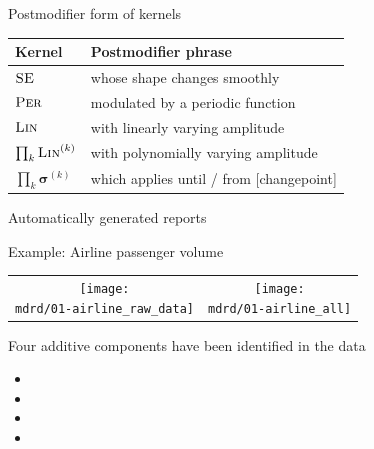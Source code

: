 \begin{frame}{Postmodifier form of kernels}
  \begin{center}
    \begin{tabular}{l|l}
      Kernel & Postmodifier phrase \\
      \midrule
      ${\textsc{SE}}$  & whose shape changes smoothly \\
      ${\textsc{Per}}$ & modulated by a periodic function \\
      ${\textsc{Lin}}$ & with linearly varying amplitude \\
      $\prod_k {\textsc{Lin}}^{(k)}$ & with polynomially varying amplitude \\
      $\prod_k \boldsymbol{\sigma}^{(k)}$ & which applies until / from [changepoint] \\
    \end{tabular}
  \end{center}
\end{frame}

\begin{frame}{Automatically generated reports}
  
\end{frame}

\begin{frame}{Example: Airline passenger volume}
\newcommand{\wmgd}{0.5\columnwidth}
\newcommand{\hmgd}{3.0cm}
\newcommand{\mdrd}{figures/01-airline}
\newcommand{\mbm}{\hspace{-0.3cm}}
\begin{tabular}{cc}
\mbm \texttt{[image: \\mdrd/01-airline\_raw\_data]} & \texttt{[image: \\mdrd/01-airline\_all]}
\end{tabular}

{\footnotesize
Four additive components have been identified in the data
\begin{itemize}

  \item  

  \item  

  \item  

  \item  

\end{itemize}
}
\end{frame}


